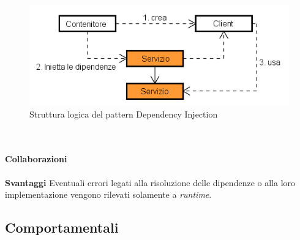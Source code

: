 \label{Struttura logica del pattern Dependency Injection}
\begin{figure}
	\centering
	\includegraphics[scale=0.45]{UML/Package/strutturaPattern/DependencyInjection.png}
	\caption{Struttura logica del pattern Dependency Injection}
\end{figure}
\\\\
\textbf{Collaborazioni}
\\\\
\textbf{Svantaggi}	Eventuali errori legati alla risoluzione delle dipendenze o alla loro implementazione vengono rilevati solamente a \textit{runtime}.


\subsection{Comportamentali}
